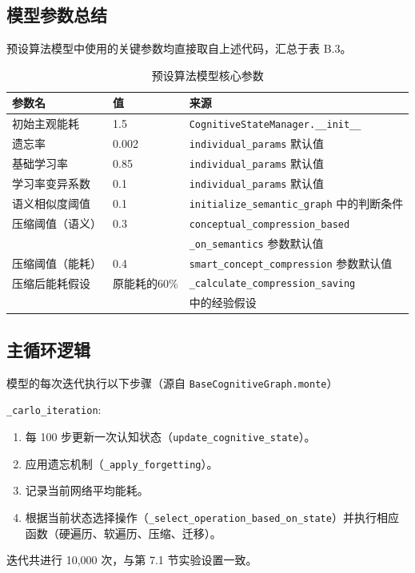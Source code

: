 \documentclass[12pt,a4paper]{article}
\begin{document}
\subsection{模型参数总结}
预设算法模型中使用的关键参数均直接取自上述代码，汇总于表 B.3。

\begin{table}[H]
\centering
\caption{预设算法模型核心参数}
\label{tab:preset_params}
\begin{tabular}{lll}
\toprule
\textbf{参数名} & \textbf{值} & \textbf{来源} \\
\midrule
初始主观能耗 & 1.5 & \texttt{CognitiveStateManager.\_\_init\_\_} \\
遗忘率 & 0.002 & \texttt{individual\_params} 默认值 \\
基础学习率 & 0.85 & \texttt{individual\_params} 默认值 \\
学习率变异系数 & 0.1 & \texttt{individual\_params} 默认值 \\
语义相似度阈值 & 0.1 & \texttt{initialize\_semantic\_graph} 中的判断条件 \\
压缩阈值（语义） & 0.3 & \texttt{conceptual\_compression\_based}  \\
 &  & \texttt{\_on\_semantics} 参数默认值 \\
压缩阈值（能耗） & 0.4 & \texttt{smart\_concept\_compression} 参数默认值 \\
压缩后能耗假设 & 原能耗的60\% & \texttt{\_calculate\_compression\_saving}  \\
 &  & 中的经验假设 \\
\bottomrule
\end{tabular}
\end{table}

\subsection{主循环逻辑}
模型的每次迭代执行以下步骤（源自 \texttt{BaseCognitiveGraph.monte}）

\noindent
 \texttt{\_carlo\_iteration}:

\begin{enumerate}
    \item 每 100 步更新一次认知状态（\texttt{update\_cognitive\_state}）。
    \item 应用遗忘机制（\texttt{\_apply\_forgetting}）。
    \item 记录当前网络平均能耗。
    \item 根据当前状态选择操作（\texttt{\_select\_operation\_based\_on\_state}）并执行相应函数（硬遍历、软遍历、压缩、迁移）。
\end{enumerate}
迭代共进行 10,000 次，与第 7.1 节实验设置一致。
\end{document}
